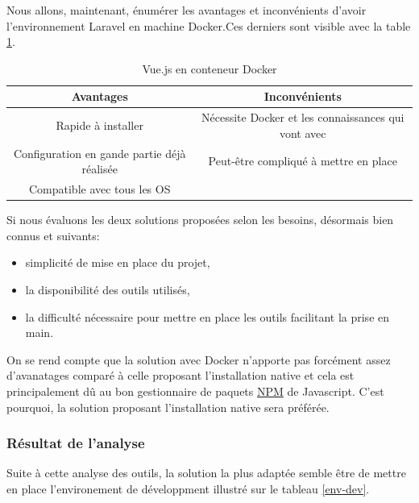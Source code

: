 \documentclass[
    iai, %
    il, %
]{heig-tb}
\begin{document}
Nous allons, maintenant, énumérer les avantages et inconvénients d'avoir l'environnement Laravel en
machine Docker.Ces derniers sont visible avec la table \ref{dev-vuejs-docker}.

\begin{table}[h]
    \begin{center}
        \caption{Vue.js en conteneur Docker \label{dev-vuejs-docker}}
        \begin{tabular}{c|c}
            Avantages                                   & Inconvénients                                       \\ \hline
            Rapide à installer                          & Nécessite Docker et les connaissances qui vont avec \\
            Configuration en gande partie déjà réalisée & Peut-être compliqué à mettre en place               \\
            Compatible avec tous les OS                 &                                                     \\
        \end{tabular}
    \end{center}
\end{table}

Si nous évaluons les deux solutions proposées selon les besoins, désormais bien connus et suivants:
\begin{itemize}
    \item simplicité de mise en place du projet,
    \item la disponibilité des outils utilisés,
    \item la difficulté nécessaire pour mettre en place les outils facilitant la prise en main.
\end{itemize}

On se rend compte que la solution avec Docker n'apporte pas forcément assez d'avanatages comparé à
celle proposant l'installation native et cela est principalement dû au bon gestionnaire de paquets
\href{https://www.npmjs.com/}{NPM} de Javascript. C'est pourquoi, la solution proposant
l'installation native sera préférée.

\subsubsection{Résultat de l'analyse}
Suite à cette analyse des outils, la solution la plus adaptée semble être de mettre en place
l'environement de développment illustré sur le tableau \ref{env-dev}.
\end{document}
